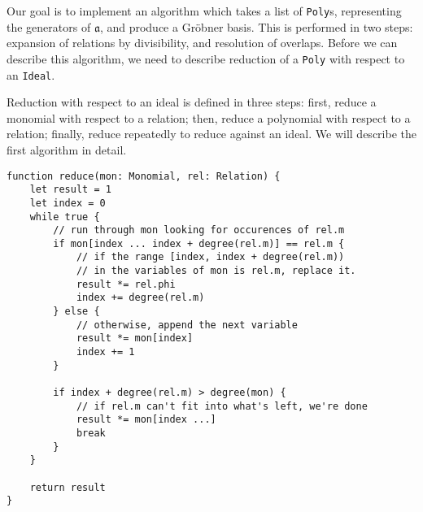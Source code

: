 Our goal is to implement an algorithm which takes a list of \verb|Poly|s, representing the
generators of $\mathfrak{a}$, and produce a Gr\"obner basis. This is performed in two
steps: expansion of relations by divisibility, and resolution of overlaps. Before
we can describe this algorithm, we need to describe reduction of a \verb|Poly| with
respect to an \verb|Ideal|.

\begin{alg}
    Reduction with respect to an ideal is defined in three steps: first, reduce
    a monomial with respect to a relation; then, reduce a polynomial with respect
    to a relation; finally, reduce repeatedly to reduce against an ideal. We will
    describe the first algorithm in detail.
\begin{verbatim}
function reduce(mon: Monomial, rel: Relation) {
    let result = 1
    let index = 0
    while true {
        // run through mon looking for occurences of rel.m
        if mon[index ... index + degree(rel.m)] == rel.m {
            // if the range [index, index + degree(rel.m)) 
            // in the variables of mon is rel.m, replace it.
            result *= rel.phi
            index += degree(rel.m)
        } else {
            // otherwise, append the next variable
            result *= mon[index]
            index += 1
        }
        
        if index + degree(rel.m) > degree(mon) {
            // if rel.m can't fit into what's left, we're done
            result *= mon[index ...]
            break
        }
    }
    
    return result
}
\end{verbatim}
\begin{comment}
// Reduce a Poly with respect to a single Relation,
// by reducing each of its terms.
function reduce(poly: Poly, rel: Relation) {
    let result = 0
    for c, m in poly {
        reduced = reduce(m, rel)
        result += reduced * v;
    }
    return result
}


\end{comment}
\end{alg}
